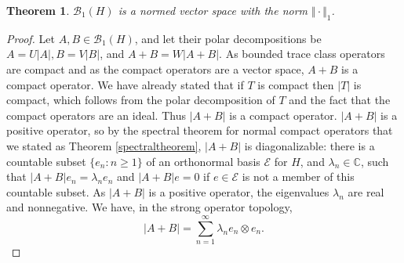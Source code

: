 \documentclass{article}
\newcommand{\norm}[1]{\Vert #1 \Vert}
\newtheorem{theorem}{Theorem}
\begin{document}
\begin{theorem}
$\mathscr{B}_1(H)$ is a normed vector space with the norm $\norm{\cdot}_1$.
\end{theorem}
\begin{proof}
Let $A,B \in \mathscr{B}_1(H)$, and let their polar decompositions be $A=U|A|, B=V|B|$, and $A+B = W|A+B|$. 
As bounded trace class operators are compact and as the compact operators are a vector space,
$A+B$ is a compact operator. We have already stated that if $T$ is compact then $|T|$ is compact, which follows
from the polar decomposition of $T$ and the fact that the compact operators are an ideal. Thus
$|A+B|$ is a compact operator. 
$|A+B|$ is a positive operator, so  by the spectral theorem for normal compact operators that we stated as Theorem \ref{spectraltheorem},
$|A+B|$ is diagonalizable: there is a countable subset $\{e_n: n \geq 1\}$ of an orthonormal basis $\mathscr{E}$ for $H$,
and $\lambda_n \in \mathbb{C}$, such that
$|A+B|e_n = \lambda_n e_n$ and $|A+B|e=0$ if $e \in \mathscr{E}$ is not a member of this countable subset.
As $|A+B|$ is a positive operator, the eigenvalues $\lambda_n$ are real and nonnegative. 
We have, in the strong operator topology,
\[
|A+B| = \sum_{n=1}^\infty \lambda_n e_n \otimes e_n.
\]


\end{proof}
\end{document}
